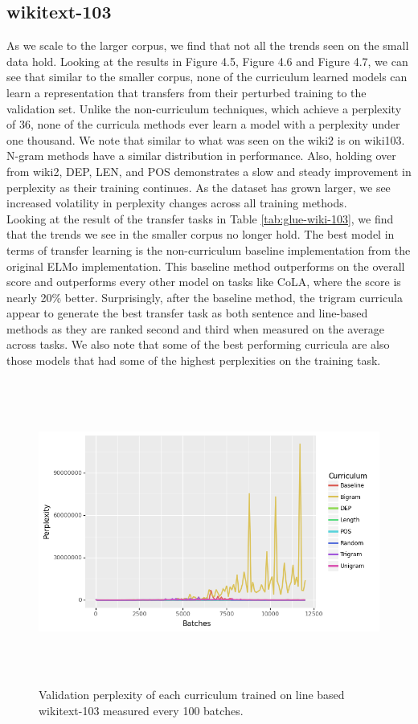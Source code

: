 \subsection{wikitext-103}
As we scale to the larger corpus, we find that not all the trends seen on the small data hold. Looking at the results in Figure 4.5, Figure 4.6 and Figure 4.7, we can see that similar to the smaller corpus, none of the curriculum learned models can learn a representation that transfers from their perturbed training to the validation set. Unlike the non-curriculum techniques, which achieve a perplexity of 36, none of the curricula methods ever learn a model with a perplexity under one thousand. We note that similar to what was seen on the wiki2 is on wiki103. N-gram methods have a similar distribution in performance. Also, holding over from wiki2, DEP, LEN, and POS demonstrates a slow and steady improvement in perplexity as their training continues. As the dataset has grown larger, we see increased volatility in perplexity changes across all training methods.\\
Looking at the result of the transfer tasks in Table \ref{tab:glue-wiki-103}, we find that the trends we see in the smaller corpus no longer hold. The best model in terms of transfer learning is the non-curriculum baseline implementation from the original ELMo implementation. This baseline method outperforms on the overall score and outperforms every other model on tasks like CoLA, where the score is nearly 20\% better. Surprisingly, after the baseline method, the trigram curricula appear to generate the best transfer task as both sentence and line-based methods as they are ranked second and third when measured on the average across tasks. We also note that some of the best performing curricula are also those models that had some of the highest perplexities on the training task. \\
\begin{figure}[H]
\centering
\label{fig:wikitext103-line}
\includegraphics[height=10cm]{Thesis/images/wikitext-103lineall.png}
\caption{Validation perplexity of each curriculum trained on line based wikitext-103 measured every 100 batches.}
\end{figure}
